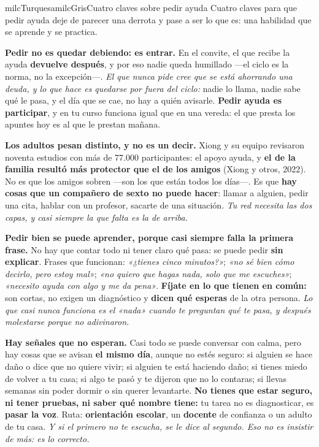\documentclass[11pt,letterpaper]{article}
\newcommand{\milcpaso}[3]{%
\Needspace{4\baselineskip}%
\begin{tcolorbox}[enhanced,colback=white,colframe=milcLinea,arc=1.5mm,boxrule=.9pt,
  left=14mm,right=4mm,top=3mm,bottom=3mm,before skip=4pt,after skip=4pt,
  fontupper=\RaggedRight,
  overlay={\node[anchor=north west,circle,fill=#2,text=white,inner sep=0pt,
    minimum size=7.4mm,font=\sffamily\bfseries\small]
    at ([xshift=3.6mm,yshift=-3.2mm]frame.north west) {#1};}]
#3
\end{tcolorbox}}
\begin{document}
\begin{softbox}{milcTurquesa}{milcGris}{Cuatro claves sobre pedir ayuda}
Cuatro claves para que pedir ayuda deje de parecer una derrota y pase a ser lo que es: una habilidad que se aprende y se practica.
\end{softbox}

\milcpaso{1}{milcTurquesa}{\textbf{Pedir no es quedar debiendo: es entrar.} En el convite, el que recibe la ayuda \textbf{devuelve después}, y por eso nadie queda humillado ---el ciclo es la norma, no la excepción---. \emph{El que nunca pide cree que se está ahorrando una deuda, y lo que hace es quedarse por fuera del ciclo:} nadie lo llama, nadie sabe qué le pasa, y el día que se cae, no hay a quién avisarle. \textbf{Pedir ayuda es participar}, y en tu curso funciona igual que en una vereda: el que presta los apuntes hoy es al que le prestan mañana.}
\milcpaso{2}{milcTurquesa}{\textbf{Los adultos pesan distinto, y no es un decir.} Xiong y su equipo revisaron noventa estudios con más de 77.000 participantes: el apoyo ayuda, y \textbf{el de la familia resultó más protector que el de los amigos} (Xiong y otros, 2022). No es que los amigos sobren ---son los que están todos los días---. Es que \textbf{hay cosas que un compañero de sexto no puede hacer}: llamar a alguien, pedir una cita, hablar con un profesor, sacarte de una situación. \emph{Tu red necesita las dos capas, y casi siempre la que falta es la de arriba.}}
\milcpaso{3}{milcTurquesa}{\textbf{Pedir bien se puede aprender, porque casi siempre falla la primera frase.} No hay que contar todo ni tener claro qué pasa: se puede pedir \textbf{sin explicar}. Frases que funcionan: \emph{«¿tienes cinco minutos?»}; \emph{«no sé bien cómo decirlo, pero estoy mal»}; \emph{«no quiero que hagas nada, solo que me escuches»}; \emph{«necesito ayuda con algo y me da pena»}. \textbf{Fíjate en lo que tienen en común:} son cortas, no exigen un diagnóstico y \textbf{dicen qué esperas} de la otra persona. \emph{Lo que casi nunca funciona es el «nada» cuando te preguntan qué te pasa, y después molestarse porque no adivinaron.}}
\milcpaso{4}{milcTurquesa}{\textbf{Hay señales que no esperan.} Casi todo se puede conversar con calma, pero hay cosas que se avisan \textbf{el mismo día}, aunque no estés seguro: si alguien se hace daño o dice que no quiere vivir; si alguien te está haciendo daño; si tienes miedo de volver a tu casa; si algo te pasó y te dijeron que no lo contaras; si llevas semanas sin poder dormir o sin querer levantarte. \textbf{No tienes que estar seguro, ni tener pruebas, ni saber qué nombre tiene:} tu tarea no es diagnosticar, es \textbf{pasar la voz}. Ruta: \textbf{orientación escolar}, un \textbf{docente} de confianza o un adulto de tu casa. \emph{Y si el primero no te escucha, se le dice al segundo. Eso no es insistir de más: es lo correcto.}}
\end{document}
